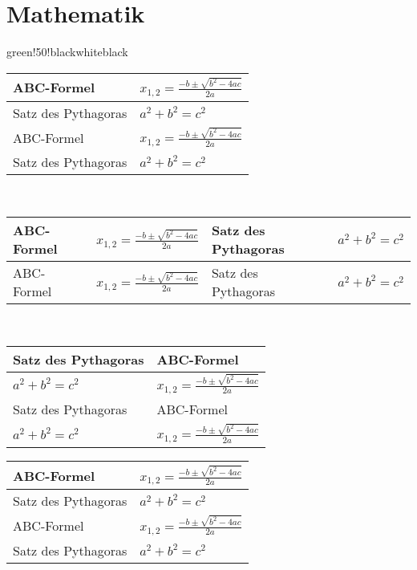 \documentclass[./main.tex]{subfiles}
\begin{document}
	\section*{Mathematik}
	\begin{formulargroup}{green!50!black}{white}{black}
		\begin{tabularx}{\linewidth}{|l|X|}\hline
			 ABC-Formel & $x_{1,2} = \frac{-b \pm \sqrt{b^2 - 4ac}}{2a}$\\\hline
			 Satz des Pythagoras & $a^2+b^2 = c^2$\\\hline
			 ABC-Formel & $x_{1,2} = \frac{-b \pm \sqrt{b^2 - 4ac}}{2a}$\\\hline
			 Satz des Pythagoras & $a^2+b^2 = c^2$\\\hline
		\end{tabularx}\\
		\noindent\begin{tabularx}{\linewidth}{|*{2}{l|X|}}\hline
			 ABC-Formel & $x_{1,2} = \frac{-b \pm \sqrt{b^2 - 4ac}}{2a}$ &  Satz des Pythagoras & $a^2+b^2 = c^2$\\\hline
			 ABC-Formel & $x_{1,2} = \frac{-b \pm \sqrt{b^2 - 4ac}}{2a}$ &  Satz des Pythagoras & $a^2+b^2 = c^2$\\\hline
		\end{tabularx}\\
		\begin{tabularx}{\linewidth}{|X|X|}\hline
			 Satz des Pythagoras &  ABC-Formel\\\hline
			$a^2+b^2 = c^2$ & $x_{1,2} = \frac{-b \pm \sqrt{b^2 - 4ac}}{2a}$ \\\hline
			 Satz des Pythagoras &  ABC-Formel\\\hline
			$a^2+b^2 = c^2$ & $x_{1,2} = \frac{-b \pm \sqrt{b^2 - 4ac}}{2a}$ \\\hline
		\end{tabularx}
		\begin{tabularx}{\linewidth}{|l|X|}\hline
			 ABC-Formel & $x_{1,2} = \frac{-b \pm \sqrt{b^2 - 4ac}}{2a}$\\\hline
			 Satz des Pythagoras & $a^2+b^2 = c^2$\\\hline
			 ABC-Formel & $x_{1,2} = \frac{-b \pm \sqrt{b^2 - 4ac}}{2a}$\\\hline
			 Satz des Pythagoras & $a^2+b^2 = c^2$\\\hline
		\end{tabularx}\\
	\end{formulargroup}
	
	\restoregeometry
\end{document}
